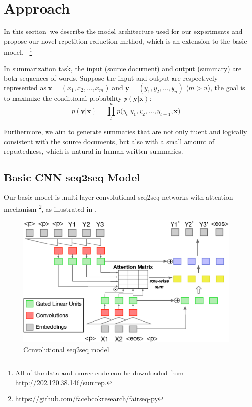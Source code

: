 \section{Approach}
\label{sec:approach}

In this section, we describe the model architecture used for our experiments
and propose our novel repetition reduction method, which is an extension to the basic model.
~\footnote{
All of the data and source code
can be downloaded from http://202.120.38.146/sumrep.}

In summarization task, the input (source document) and
output (summary) are both sequences of words.
Suppose the input and output are respectively represented as
$\textbf{x} = (x_{1},x_{2},...,x_{m})$ and 
$\textbf{y} = (y_{1}, y_{2},..., y_{n})$ ($m>n$),
the goal is to maximize the conditional probability
$p(\textbf{y}|\textbf{x})$:
\begin{equation}
p(\textbf{y} | \textbf{x}) \!=\! {\prod^n_{t} {p(y_{t} | y_{1}, y_{2},..., y_{t-1}, \textbf{x}})}
\end{equation}

Furthermore, we aim to generate summaries that are not only fluent 
and logically consistent with the source documents, but also with 
a small amount of repeatedness, which is natural in human written summaries.  

\subsection{Basic CNN seq2seq Model}
\label{sec:basic}
Our basic model is multi-layer convolutional seq2seq networks \citep{gehring2017convs2s} with attention mechanism
\footnote{\url{https://github.com/facebookresearch/fairseq-py}}, 
as illustrated in . 

\begin{figure}[th]
    \centering
    \includegraphics[width=0.7\linewidth]{cnn}
    \caption{Convolutional seq2seq model.}
    \label{fig:basicModel}
\end{figure}


